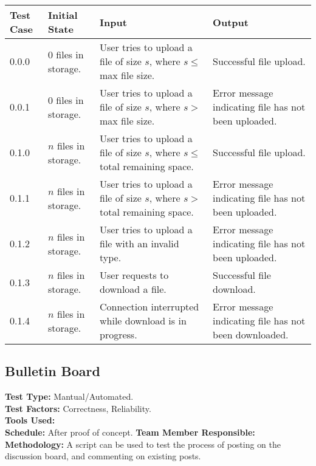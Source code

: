 \documentclass[12pt]{article}
\begin{document}
\begin{longtable}{|p{2cm}|p{3cm}|p{5cm}|p{5cm}|}
  \hline
  \textbf{Test Case} & \textbf{Initial State} & \textbf{Input} & \textbf{Output} \\ \hline
  0.0.0 & 0 files in storage. & User tries to upload a file of size $s$, where $s \le$ max file size. & Successful file upload.\\
  \hline
  0.0.1 & 0 files in storage. & User tries to upload a file of size $s$, where $s >$ max file size. & Error message indicating file has not been uploaded.\\
  \hline
  0.1.0 & $n$ files in storage. & User tries to upload a file of size $s$, where $s \le$ total remaining space. & Successful file upload.\\
  \hline
  0.1.1 & $n$ files in storage. & User tries to upload a file of size $s$, where $s >$ total remaining space. & Error message indicating file has not been uploaded.\\
  \hline
  0.1.2 & $n$ files in storage. & User tries to upload a file with an invalid type. & Error message indicating file has not been uploaded.\\
  \hline
  0.1.3 & $n$ files in storage. & User requests to download a file. & Successful file download.\\
  \hline
  0.1.4 & $n$ files in storage. & Connection interrupted while download is in progress. & Error message indicating file has not been downloaded.\\
  \hline
\end{longtable}

\subsection{Bulletin Board}
\textbf{Test Type:} Mantual/Automated. \\
\textbf{Test Factors:} Correctness, Reliability. \\
\textbf{Tools Used:} \\
\textbf{Schedule:} After proof of concept.
\textbf{Team Member Responsible:} \\
\textbf{Methodology:} A script can be used to test the process of posting on the discussion board, and commenting on existing posts.
\end{document}
